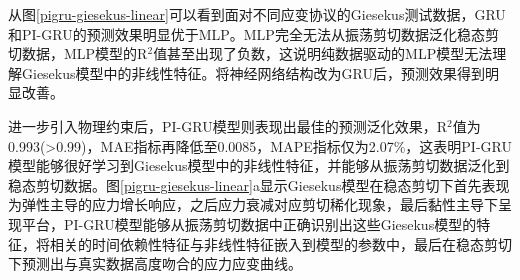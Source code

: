 从图\ref{pigru-giesekus-linear}可以看到面对不同应变协议的Giesekus测试数据，GRU和PI-GRU的预测效果明显优于MLP。MLP完全无法从振荡剪切数据泛化稳态剪切数据，MLP模型的R$^2$值甚至出现了负数，这说明纯数据驱动的MLP模型无法理解Giesekus模型中的非线性特征。将神经网络结构改为GRU后，预测效果得到明显改善。

进一步引入物理约束后，PI-GRU模型则表现出最佳的预测泛化效果，R$^2$值为0.993(>0.99)，MAE指标再降低至0.0085，MAPE指标仅为2.07\%，这表明PI-GRU模型能够很好学习到Giesekus模型中的非线性特征，并能够从振荡剪切数据泛化到稳态剪切数据。图\ref{pigru-giesekus-linear}a显示Giesekus模型在稳态剪切下首先表现为弹性主导的应力增长响应，之后应力衰减对应剪切稀化现象，最后黏性主导下呈现平台，PI-GRU模型能够从振荡剪切数据中正确识别出这些Giesekus模型的特征，将相关的时间依赖性特征与非线性特征嵌入到模型的参数中，最后在稳态剪切下预测出与真实数据高度吻合的应力应变曲线。

